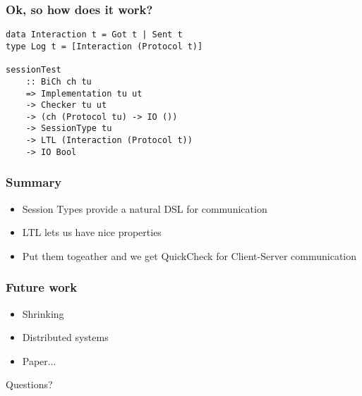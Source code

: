 \documentclass{beamer}
\begin{document}
\begin{frame}[fragile]
    \frametitle{Ok, so how does it work?}
    \begin{verbatim}
data Interaction t = Got t | Sent t
type Log t = [Interaction (Protocol t)]

sessionTest
    :: BiCh ch tu
    => Implementation tu ut
    -> Checker tu ut
    -> (ch (Protocol tu) -> IO ())
    -> SessionType tu
    -> LTL (Interaction (Protocol t))
    -> IO Bool
    \end{verbatim}
\end{frame}

\begin{frame}
    \frametitle{Summary}
    \begin{itemize}
        \item Session Types provide a natural DSL for communication
        \item LTL lets us have nice properties
        \item Put them togeather and we get QuickCheck for Client-Server communication
    \end{itemize}
\end{frame}

\begin{frame}
    \frametitle{Future work}
    \begin{itemize}
        \item Shrinking
        \item Distributed systems
        \item Paper...
    \end{itemize}
\end{frame}
\begin{frame}
    \Huge{\centerline{Questions?}}
\end{frame}
\end{document}
